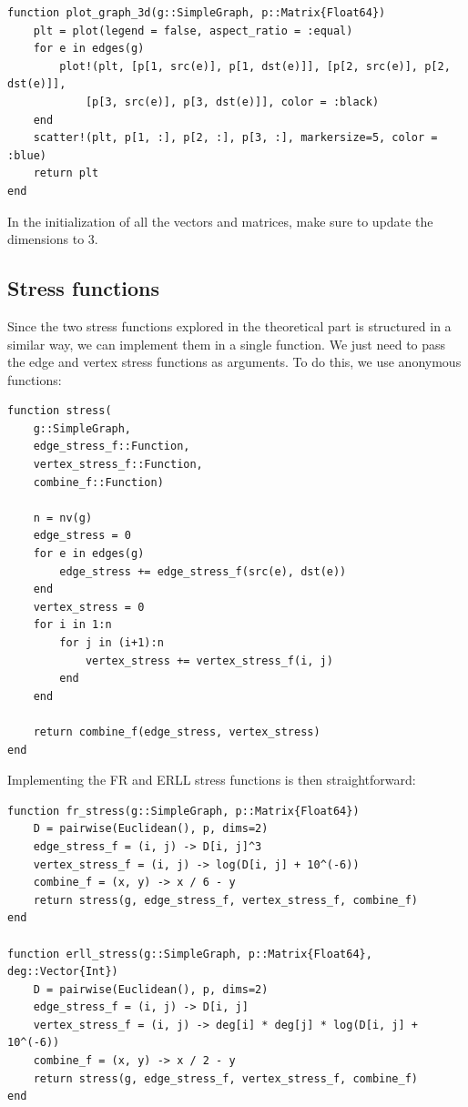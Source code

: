 \documentclass[12pt]{article}
\begin{document}
\begin{verbatim}
function plot_graph_3d(g::SimpleGraph, p::Matrix{Float64})
    plt = plot(legend = false, aspect_ratio = :equal)
    for e in edges(g)
        plot!(plt, [p[1, src(e)], p[1, dst(e)]], [p[2, src(e)], p[2, dst(e)]],
            [p[3, src(e)], p[3, dst(e)]], color = :black)
    end
    scatter!(plt, p[1, :], p[2, :], p[3, :], markersize=5, color = :blue)
    return plt
end
\end{verbatim}

In the initialization of all the vectors and matrices, make sure to update the dimensions to $3$.

\subsection{Stress functions}

Since the two stress functions explored in the theoretical part is structured in a similar way,
we can implement them in a single function. We just need to pass the edge and vertex stress functions
as arguments. To do this, we use anonymous functions:

\begin{verbatim}
function stress(
    g::SimpleGraph, 
    edge_stress_f::Function, 
    vertex_stress_f::Function, 
    combine_f::Function)

    n = nv(g)
    edge_stress = 0
    for e in edges(g)
        edge_stress += edge_stress_f(src(e), dst(e))
    end
    vertex_stress = 0
    for i in 1:n
        for j in (i+1):n
            vertex_stress += vertex_stress_f(i, j)
        end
    end

    return combine_f(edge_stress, vertex_stress)
end
\end{verbatim}

Implementing the FR and ERLL stress functions is then straightforward:

\begin{verbatim}
function fr_stress(g::SimpleGraph, p::Matrix{Float64})
    D = pairwise(Euclidean(), p, dims=2)
    edge_stress_f = (i, j) -> D[i, j]^3
    vertex_stress_f = (i, j) -> log(D[i, j] + 10^(-6))
    combine_f = (x, y) -> x / 6 - y
    return stress(g, edge_stress_f, vertex_stress_f, combine_f)
end

function erll_stress(g::SimpleGraph, p::Matrix{Float64}, deg::Vector{Int})
    D = pairwise(Euclidean(), p, dims=2)
    edge_stress_f = (i, j) -> D[i, j]
    vertex_stress_f = (i, j) -> deg[i] * deg[j] * log(D[i, j] + 10^(-6))
    combine_f = (x, y) -> x / 2 - y
    return stress(g, edge_stress_f, vertex_stress_f, combine_f)
end
\end{verbatim}
\end{document}
